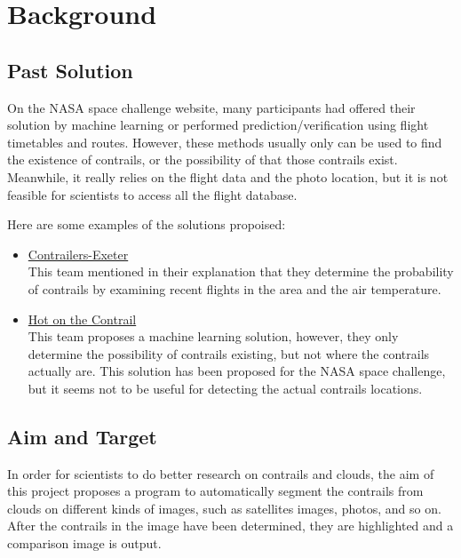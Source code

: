 \chapter{Background}


\section{Past Solution}

On the NASA space challenge website, many participants had offered their solution 
by machine learning or performed prediction/verification using flight timetables 
and routes. However, these methods usually only can be used to find the existence 
of contrails, or the possibility of that those contrails exist. Meanwhile, it 
really relies on the flight data and the photo location, but it is not feasible
for scientists to access all the flight database.

Here are some examples of the solutions propoised:
\begin{itemize}
\item \href{https://2016.spaceappschallenge.org/challenges/aero/clouds-or-contrails/projects/contrailers-exeter}{Contrailers-Exeter} \\
This team mentioned in their explanation that they determine the probability 
of contrails by examining recent flights in the area and the air temperature. 
\item \href{https://2016.spaceappschallenge.org/challenges/aero/clouds-or-contrails/projects/hot-on-the-contrail}{Hot on the Contrail}\\
This team proposes a machine learning solution, however, they only determine 
the possibility of contrails existing, but not where the contrails actually are. 
This solution has been proposed for the NASA space challenge, but it seems not 
to be useful for detecting the actual contrails locations.  
\end{itemize}

\section{Aim and Target}

In order for scientists to do better research on contrails and clouds, 
the aim of this project proposes a program to automatically segment the 
contrails from clouds on different kinds of images, such as satellites 
images, photos, and so on. After the contrails in the image have been 
determined, they are highlighted and a comparison image is output.

